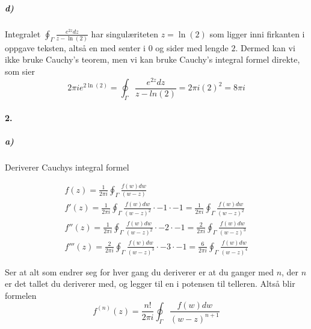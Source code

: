 \documentclass[11pt, A4paper,norsk]{article}
\begin{document}
			\subparagraph{d)}
				\begin{flushleft}
Integralet $\oint_{\Gamma} \frac{e^{2z}dz}{z - \ln(2)}$ har singulæriteten $z = \ln(2)$ som ligger inni firkanten i oppgave teksten, altså en med senter i $0$ og sider med lengde $2$. Dermed kan vi ikke bruke Cauchy's teorem, men vi kan bruke Cauchy's integral formel direkte, som sier
$$2 \pi i e^{2 \ln(2)} = \oint_{\Gamma} \frac{e^{2z}dz}{z - ln(2)} = 2 \pi i (2)^2 = 8 \pi i$$
				\end{flushleft}










		\paragraph{2.}
			\subparagraph{a)}
				\begin{flushleft}
Deriverer Cauchys integral formel
				\end{flushleft}
				\begin{gather*}
f(z) = \frac{1}{2 \pi i} \oint_{\Gamma} \frac{f(w) dw}{( w - z)} \\
f'(z) = \frac{1}{2 \pi i} \oint_{\Gamma} \frac{f(w) dw}{(w - z)^{2}} \cdot - 1 \cdot - 1 = \frac{1}{2 \pi i} \oint_{\Gamma} \frac{f(w) dw}{(w - z)^{2}} \\
f''(z) = \frac{1}{2 \pi i} \oint_{\Gamma} \frac{f(w) dw}{(w - z)^{2}} \cdot - 2 \cdot - 1 = \frac{2}{2 \pi i} \oint_{\Gamma} \frac{f(w) dw}{(w - z)^{3}} \\
f'''(z) = \frac{2}{2 \pi i} \oint_{\Gamma} \frac{f(w) dw}{(w - z)^{3}} \cdot - 3 \cdot - 1 = \frac{6}{2 \pi i} \oint_{\Gamma} \frac{f(w) dw}{(w - z)^{4}}
				\end{gather*}
				\begin{flushleft}
Ser at alt som endrer seg for hver gang du deriverer er at du ganger med $n$, der $n$ er det tallet du deriverer med, og legger til en i potensen til telleren. Altså blir formelen 
$$f^{(n)}(z) = \frac{n!}{2 \pi i} \oint_{\Gamma} \frac{f(w) dw}{(w - z)^{n + 1}}$$
				\end{flushleft}
\end{document}
